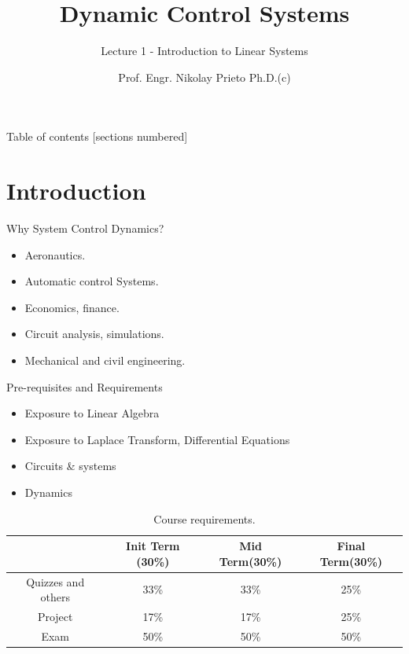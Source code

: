 \documentclass[10pt]{beamer}
\title{Dynamic Control Systems}
\subtitle{Lecture 1 - Introduction to Linear Systems}
\date{}
\author{Prof. Engr. Nikolay Prieto Ph.D.(c)}
\institute{Escuela Colombiana de Carreras Industriales - ECCI}
\begin{document}
\maketitle

\begin{frame}{Table of contents}
  [sections numbered]
  \tableofcontents[hideallsubsections]
\end{frame}

\section{Introduction}

\begin{frame}[fragile]{Why System Control Dynamics?}
  \begin{itemize}[<+- | alert@+>]
    \item Aeronautics.
    \item Automatic control Systems.
    \item Economics, finance.
    \item Circuit analysis, simulations.
    \item Mechanical and civil engineering.
  \end{itemize}
\end{frame}

\begin{frame}[fragile]{Pre-requisites and Requirements}
    \begin{itemize}
        \item Exposure to Linear Algebra
        \item Exposure to Laplace Transform, Differential Equations
        \item Circuits \& systems
        \item Dynamics 
    \end{itemize}

    
    \begin{table}
    \begin{centering}
    \begin{tabular}{|c|c|c|c|}
    \hline 
     & Init Term (30\%) & Mid Term(30\%) & Final Term(30\%)\tabularnewline
    \hline 
    \hline 
    Quizzes and others & 33\% & 33\% & 25\%\tabularnewline
    \hline 
    Project & 17\% & 17\% & 25\%\tabularnewline
    \hline 
    Exam & 50\% & 50\% & 50\%\tabularnewline
    \hline 
    \end{tabular}
    \par\end{centering}
    \caption{Course requirements.}
    \end{table}

\end{frame}
\end{document}
